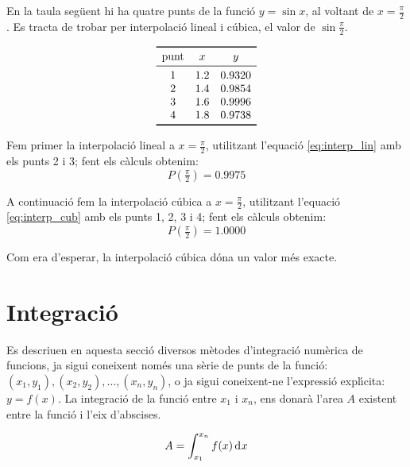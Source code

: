 \begin{exemple}
    En la taula seg\"{u}ent hi ha quatre punts de la funci\'{o} $y = \sin x$, al voltant de $x=\frac{\pi}{2}$. Es tracta de trobar per interpolaci\'{o} lineal i c\'{u}bica, el valor de $\sin \frac{\pi}{2}$.
    \vspace{-8mm}
    \begin{center}
        \[\begin{array}{ccc}
           \toprule[1pt]
              \text{punt} & x  & y \\
           \midrule
              1 & \num{1,2} & \num{0,9320} \\
              2 & \num{1,4} & \num{0,9854} \\
              3 & \num{1,6} & \num{0,9996} \\
              4 & \num{1,8} & \num{0,9738} \\
           \bottomrule[1pt]
        \end{array} \]
    \end{center}

    Fem primer la interpolaci\'{o} lineal a $x= \frac{\pi}{2}$, utilitzant l'equaci\'{o} \eqref{eq:interp_lin} amb els punts 2 i 3; fent els c\`{a}lculs obtenim:
    \[ P\left(\tfrac{\pi}{2}\right) = \num{0,9975} \]

    A continuaci\'{o} fem la interpolaci\'{o} c\'{u}bica a $x= \frac{\pi}{2}$, utilitzant l'equaci\'{o} \eqref{eq:interp_cub} amb els punts 1, 2, 3 i 4; fent els c\`{a}lculs obtenim:
    \[ P\left(\tfrac{\pi}{2}\right) = \num{1,0000} \]

    Com era d'esperar, la interpolaci\'{o} c\'{u}bica d\'{o}na un valor m\'{e}s exacte.
\end{exemple}


\section{Integraci\'{o}}

Es descriuen en aquesta secci\'{o} diversos m\`{e}todes d'integraci\'{o} num\`{e}rica de funcions, ja sigui coneixent nom\'{e}s una s\`{e}rie de punts de la funci\'{o}: $(x_1, y_1), (x_2, y_2), \dots ,(x_n, y_n)$, o ja sigui coneixent-ne l'expressi\'{o} expl\'{\i}cita: $y=f(x)$. La integraci\'{o} de la funci\'{o} entre $x_1$ i $x_n$, ens donar\`{a} l'area $A$ existent entre la funci\'{o} i l'eix d'abscises.

 \begin{equation}
    A = \int_{x_1}^{x_n} f(x) \diff x
 \end{equation}

